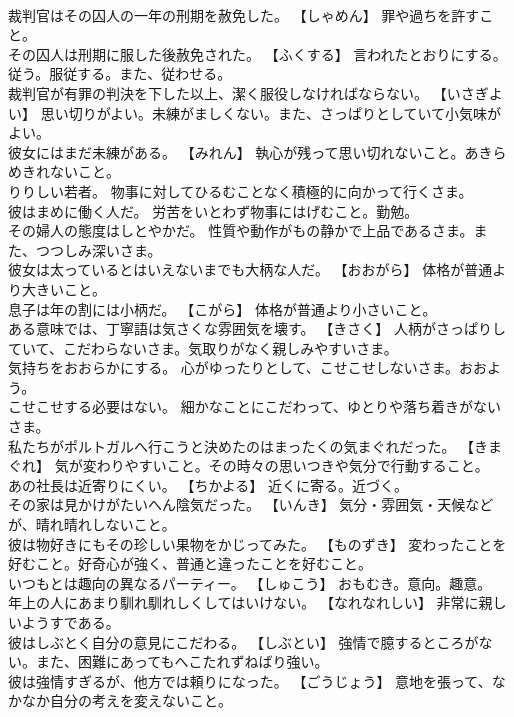 \documentclass[8pt]{extreport}
\begin{document}
\begin{CJK}{UTF8}{min}
\\	裁判官はその囚人の一年の刑期を赦免した。	【しゃめん】 罪や過ちを許すこと。
\\	その囚人は刑期に服した後赦免された。	【ふくする】 言われたとおりにする。従う。服従する。また、従わせる。
\\	裁判官が有罪の判決を下した以上、潔く服役しなければならない。	【いさぎよい】 思い切りがよい。未練がましくない。また、さっぱりとしていて小気味がよい。
\\	彼女にはまだ未練がある。	【みれん】 執心が残って思い切れないこと。あきらめきれないこと。
\\	りりしい若者。	物事に対してひるむことなく積極的に向かって行くさま。
\\	彼はまめに働く人だ。	労苦をいとわず物事にはげむこと。勤勉。
\\	その婦人の態度はしとやかだ。	性質や動作がもの静かで上品であるさま。また、つつしみ深いさま。
\\	彼女は太っているとはいえないまでも大柄な人だ。	【おおがら】 体格が普通より大きいこと。
\\	息子は年の割には小柄だ。	【こがら】 体格が普通より小さいこと。
\\	ある意味では、丁寧語は気さくな雰囲気を壊す。	【きさく】 人柄がさっぱりしていて、こだわらないさま。気取りがなく親しみやすいさま。
\\	気持ちをおおらかにする。	心がゆったりとして、こせこせしないさま。おおよう。
\\	こせこせする必要はない。	細かなことにこだわって、ゆとりや落ち着きがないさま。
\\	私たちがポルトガルへ行こうと決めたのはまったくの気まぐれだった。	【きまぐれ】 気が変わりやすいこと。その時々の思いつきや気分で行動すること。
\\	あの社長は近寄りにくい。	【ちかよる】 近くに寄る。近づく。
\\	その家は見かけがたいへん陰気だった。	【いんき】 気分・雰囲気・天候などが、晴れ晴れしないこと。
\\	彼は物好きにもその珍しい果物をかじってみた。	【ものずき】 変わったことを好むこと。好奇心が強く、普通と違ったことを好むこと。
\\	いつもとは趣向の異なるパーティー。	【しゅこう】 おもむき。意向。趣意。
\\	年上の人にあまり馴れ馴れしくしてはいけない。	【なれなれしい】 非常に親しいようすである。
\\	彼はしぶとく自分の意見にこだわる。	【しぶとい】 強情で臆するところがない。また、困難にあってもへこたれずねばり強い。
\\	彼は強情すぎるが、他方では頼りになった。	【ごうじょう】 意地を張って、なかなか自分の考えを変えないこと。

\end{CJK}
\end{document}
